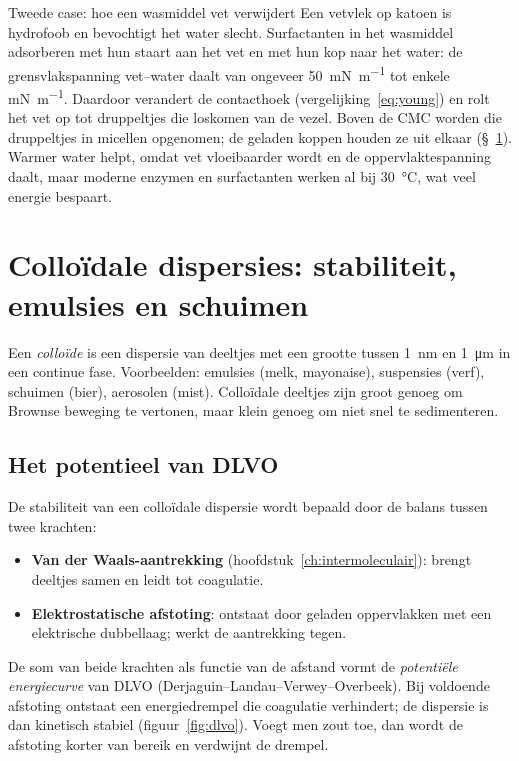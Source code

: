 \begin{toepassing}{Tweede case: hoe een wasmiddel vet verwijdert}
Een vetvlek op katoen is hydrofoob en bevochtigt het water slecht. Surfactanten in het wasmiddel adsorberen met hun staart aan het vet en met hun kop naar het water: de grensvlakspanning vet--water daalt van ongeveer \SI{50}{\milli\newton\per\metre} tot enkele \si{\milli\newton\per\metre}. Daardoor verandert de contacthoek (vergelijking~\eqref{eq:young}) en rolt het vet op tot druppeltjes die loskomen van de vezel. Boven de CMC worden die druppeltjes in micellen opgenomen; de geladen koppen houden ze uit elkaar (\S~\ref{sec:colloiden}). Warmer water helpt, omdat vet vloeibaarder wordt en de oppervlaktespanning daalt, maar moderne enzymen en surfactanten werken al bij \SI{30}{\celsius}, wat veel energie bespaart.
\end{toepassing}

\section{Collo\"idale dispersies: stabiliteit, emulsies en schuimen}
\label{sec:colloiden}

Een \emph{collo\"ide} is een dispersie van deeltjes met een grootte tussen \SI{1}{\nano\metre} en \SI{1}{\micro\metre} in een continue fase. Voorbeelden: emulsies (melk, mayonaise), suspensies (verf), schuimen (bier), aerosolen (mist). Collo\"idale deeltjes zijn groot genoeg om Brownse beweging te vertonen, maar klein genoeg om niet snel te sedimenteren.

\subsection{Het potentieel van DLVO}
\label{sec:dlvo}

De stabiliteit van een collo\"idale dispersie wordt bepaald door de balans tussen twee krachten:
\begin{itemize}
\item \textbf{Van der Waals-aantrekking} (hoofdstuk~\ref{ch:intermoleculair}): brengt deeltjes samen en leidt tot coagulatie.
\item \textbf{Elektrostatische afstoting}: ontstaat door geladen oppervlakken met een elektrische dubbellaag; werkt de aantrekking tegen.
\end{itemize}
De som van beide krachten als functie van de afstand vormt de \emph{potenti\"ele energiecurve} van DLVO (Derjaguin--Landau--Verwey--Overbeek). Bij voldoende afstoting ontstaat een energiedrempel die coagulatie verhindert; de dispersie is dan kinetisch stabiel (figuur~\ref{fig:dlvo}). Voegt men zout toe, dan wordt de afstoting korter van bereik en verdwijnt de drempel.

